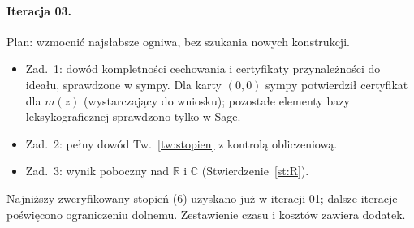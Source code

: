 \paragraph{Iteracja 03.} Plan: wzmocnić najsłabsze ogniwa, bez szukania nowych konstrukcji.
\begin{itemize}
\item Zad.~1: dowód kompletności cechowania i certyfikaty przynależności do ideału,
sprawdzone w sympy. Dla karty $(0,0)$ sympy potwierdził certyfikat dla $m(z)$ (wystarczający
do wniosku); pozostałe elementy bazy leksykograficznej sprawdzono tylko w Sage.
\item Zad.~2: pełny dowód Tw.~\ref{tw:stopien} z kontrolą obliczeniową.
\item Zad.~3: wynik poboczny nad $\mathbb R$ i $\mathbb C$ (Stwierdzenie~\ref{st:R}).
\end{itemize}

Najniższy zweryfikowany stopień (6) uzyskano już w iteracji 01; dalsze iteracje
poświęcono ograniczeniu dolnemu. Zestawienie czasu i kosztów zawiera dodatek.
